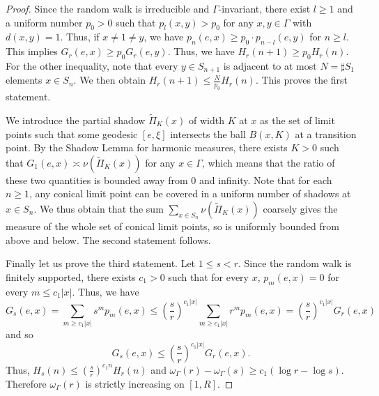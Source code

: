 \documentclass{amsart}
\theoremstyle{definition}
\theoremstyle{remark}
\begin{document}
\begin{proof}
Since the random walk is irreducible and $\Gamma$-invariant, there exist %
$l \ge 1$ and a uniform number $p_0 > 0$ such that $p_l(x, y) > p_0$ for any $x,y\in \Gamma$ with $d(x,y)=1$. Thus, if $x\ne 1\ne y$, we have $p_n(e,x)\ge p_0\cdot  p_{n-l}(e,y)$ for $n\ge l$. This implies $G_r(e, x)\ge p_0 G_r(e,y)$. Thus, we have $H_{r}(n+1)\ge p_0 H_{r}(n)$.
For the other inequality, note that every  $y\in S_{n+1}$ is adjacent   to at most $N=\sharp S_1$ elements  $x\in S_{n}$.  
We then obtain $H_{r}(n+1)\le \frac{N}{p_0} H_{r}(n)$.
This proves the first statement.


We introduce the partial shadow $\widetilde{\Pi}_K(x)$ of width $K$ at $x$ as the set of limit points such that some geodesic $[e,\xi]$ intersects the ball $B(x,K)$ at a transition point. By the Shadow Lemma \cite[Proposition~4.4]{DG20} for harmonic measures, there exists $K>0$ such that $G_1(e,x)\asymp \nu(\widetilde{\Pi}_K(x))$ for any $x\in \Gamma$, which means that the ratio of these two quantities is bounded away from 0 and infinity.
Note that for each $n\ge 1$, any conical limit point can be covered in a uniform number of shadows at $x\in S_n$. We thus obtain that the sum $\sum_{x\in S_n} \nu(\widetilde{\Pi}_K(x))$ coarsely gives the measure of the whole set of conical limit points, so is uniformly bounded from above and below. The second statement follows.


Finally let us prove the third statement.
Let $1\le s<r$.
Since the random walk is finitely supported, there exists $c_1>0$ such that for every $x$, $p_m(e,x)=0$ for every $m\leq c_1|x|$.
Thus, we have
$$G_s(e,x)=\sum_{m\geq c_1 |x|}s^m p_m(e,x)
\leq \left(\frac{s}{r}\right)^{c_1 |x|}\sum_{m \geq c_1 |x|}r^m p_m(e,x)
=\left(\frac{s}{r}\right)^{c_1 |x|}G_r(e,x)$$ and so
\begin{equation}\label{exponentialdifferenceGreen}
G_s(e,x)\leq \left(\frac{s}{r}\right)^{c_1 |x|}G_r(e,x).
\end{equation}
Thus, $H_s(n) \leq \left( \frac{s}{r} \right)^{c_1 n} H_r(n)$ and $\omega_{\Gamma}(r) -  \omega_{\Gamma}(s) \ge c_1 \left( \log r  - \log s\right)$.  Therefore $\omega_{\Gamma}(r)$ is strictly increasing on $[1, R]$.


\end{proof}
\end{document}

